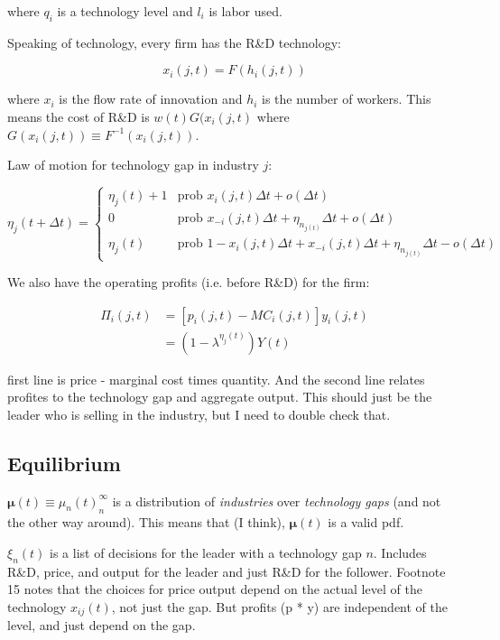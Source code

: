 \documentclass[11pt]{article}
\begin{document}
  where $q_i$ is a technology level and $l_i$ is labor used.

  Speaking of technology, every firm has the R\&D technology:

  \begin{equation} \label{eq:tech_rd_technology}
    x_i(j, t) = F(h_i(j, t))
  \end{equation}

  where $x_i$ is the flow rate of innovation and $h_i$ is the number of workers.  This means the cost of R\&D is $w(t)G(x_i(j,t)$ where $G(x_i(j,t)) \equiv F^{-1}(x_i(j,t))$.

  Law of motion for technology gap in industry $j$:

  \begin{equation} \label{eq:tech_law_of_motion}
    \eta_j(t + \Delta t) =
    \begin{cases}
      \eta_j(t) + 1 & \textrm{prob } x_i(j,t)\Delta t + o(\Delta t)\\
      0 & \textrm{prob } x_{-i}(j,t)\Delta t + \eta_{n_{j(t)}}\Delta t + o(\Delta t) \\
      \eta_j(t) & \textrm{prob } 1 - x_i(j,t)\Delta t + x_{-i}(j,t)\Delta t + \eta_{n_{j(t)}}\Delta t - o(\Delta t)
    \end{cases}
  \end{equation}

  We also have the operating profits (i.e. before R\&D) for the firm:
  
  \begin{align*} \label{eq:profits}
    \Pi_i(j, t) &= [p_i(j, t) - MC_i(j, t)]y_i(j, t)\\
                &= (1 - \lambda^{\eta_j(t)})Y(t)
  \end{align*}

  first line is price - marginal cost times quantity.  And the second line relates profites to the technology gap and aggregate output.  This should just be the leader who is selling in the industry, but I need to double check that.

\subsection{Equilibrium}
\label{sub:equilibrium}
  $\bm{\mu}(t) \equiv {\mu_n(t)}_n^\infty$ is a distribution of \emph{industries} over \emph{technology gaps} (and not the other way around).  This means that (I think), $\bm{\mu}(t)$ is a valid pdf.

  $\xi_n(t)$ is a list of decisions for the leader with a technology gap $n$.  Includes R\&D, price, and output for the leader and just R\&D for the follower.  Footnote 15 notes that the choices for price output depend on the actual level of the technology $x_{ij}(t)$, not just the gap.  But profits (p * y) are independent of the level, and just depend on the gap.
\end{document}
